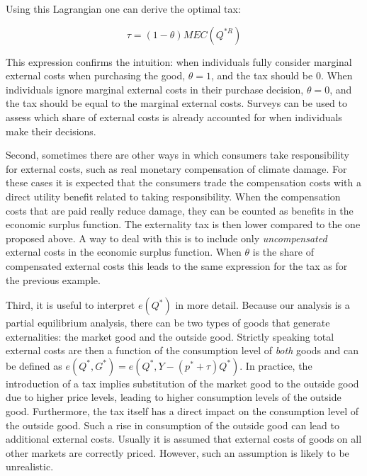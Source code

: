 \documentclass[
]{book}
\begin{document}
Using this Lagrangian one can derive the optimal tax:

\begin{equation}
\tau = (1 - \theta) MEC(Q^{* R})
\end{equation}

This expression confirms the intuition: when individuals fully consider marginal external costs when purchasing the good, \(\theta=1\), and the tax should be \(0\). When individuals ignore marginal external costs in their purchase decision, \(\theta=0\), and the tax should be equal to the marginal external costs. Surveys can be used to assess which share of external costs is already accounted for when individuals make their decisions.

Second, sometimes there are other ways in which consumers take responsibility for external costs, such as real monetary compensation of climate damage. For these cases it is expected that the consumers trade the compensation costs with a direct utility benefit related to taking responsibility. When the compensation costs that are paid really reduce damage, they can be counted as benefits in the economic surplus function. The externality tax is then lower compared to the one proposed above. A way to deal with this is to include only \emph{uncompensated} external costs in the economic surplus function. When \(\theta\) is the share of compensated external costs this leads to the same expression for the tax as for the previous example.

Third, it is useful to interpret \(e(Q^*)\) in more detail. Because our analysis is a partial equilibrium analysis, there can be two types of goods that generate externalities: the market good and the outside good. Strictly speaking total external costs are then a function of the consumption level of \emph{both} goods and can be defined as \(e(Q^*,G^* )=e(Q^*,Y-(p^*+\tau)Q^* )\). In practice, the introduction of a tax implies substitution of the market good to the outside good due to higher price levels, leading to higher consumption levels of the outside good. Furthermore, the tax itself has a direct impact on the consumption level of the outside good. Such a rise in consumption of the outside good can lead to additional external costs. Usually it is assumed that external costs of goods on all other markets are correctly priced. However, such an assumption is likely to be unrealistic.
\end{document}
